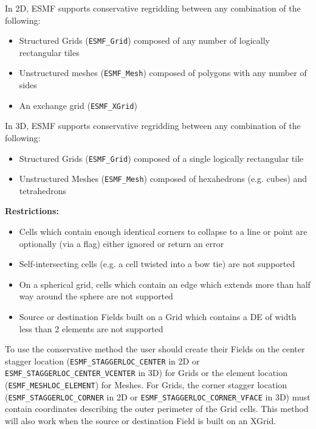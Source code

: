 \smallskip

 In 2D, ESMF supports conservative regridding between any combination of the following:
 \begin{itemize}
 \item Structured Grids ({\tt ESMF\_Grid}) composed of any number of logically rectangular tiles
 \item Unstructured meshes ({\tt ESMF\_Mesh}) composed of polygons with any number of sides
 \item An exchange grid ({\tt ESMF\_XGrid})
 \end{itemize}

\smallskip

 In 3D, ESMF supports conservative regridding between any combination of the following:
 \begin{itemize}
 \item Structured Grids ({\tt ESMF\_Grid}) composed of a single logically rectangular tile
 \item Unstructured Meshes ({\tt ESMF\_Mesh}) composed of hexahedrons (e.g. cubes) and tetrahedrons
 \end{itemize}

\smallskip

{\bf Restrictions:}
 \begin{itemize}
 \item Cells which contain enough identical corners to collapse to a line or point are optionally (via a flag) either ignored or return an error
 \item Self-intersecting cells (e.g. a cell twisted into a bow tie) are not supported
 \item On a spherical grid, cells which contain an edge which extends more than half way around the sphere are not supported 
 \item Source or destination Fields built on a Grid which contains a DE of width less than 2 elements are not supported
 \end{itemize}

\smallskip

 To use the conservative method the user should create their Fields on the center 
 stagger location ({\tt ESMF\_STAGGERLOC\_CENTER} in 2D or {\tt ESMF\_STAGGERLOC\_CENTER\_VCENTER} in 3D) for Grids  or the element location ({\tt ESMF\_MESHLOC\_ELEMENT}) for Meshes.
 For Grids, the corner stagger location ({\tt ESMF\_STAGGERLOC\_CORNER} in 2D or {\tt ESMF\_STAGGERLOC\_CORNER\_VFACE} in 3D) must contain coordinates describing the outer perimeter of the Grid cells. This method will also work when the source or destination Field is built on an XGrid.

